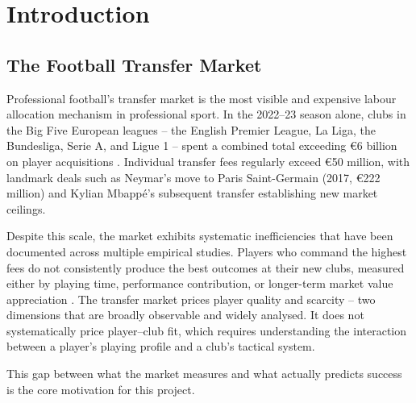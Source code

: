 \documentclass[12pt, a4paper, oneside]{report}
\begin{document}
\begin{titlepage}
\begin{abstract}
The system is deployed as an interactive Streamlit application with a complete scouting workflow including candidate filtering, fit scoring, injury watch mode, similar player search via embedding cosine similarity, and a market intelligence module.
\end{abstract}

\end{titlepage}

\tableofcontents
\newpage
\listoffigures
\newpage
\listoftables
\newpage

\chapter{Introduction}

\section{The Football Transfer Market}

Professional football's transfer market is the most visible and expensive labour allocation mechanism in professional sport. In the 2022--23 season alone, clubs in the Big Five European leagues -- the English Premier League, La Liga, the Bundesliga, Serie A, and Ligue 1 -- spent a combined total exceeding \euro{}6 billion on player acquisitions \citep{transfermarkt2023}. Individual transfer fees regularly exceed \euro{}50 million, with landmark deals such as Neymar's move to Paris Saint-Germain (2017, \euro{}222 million) and Kylian Mbappé's subsequent transfer establishing new market ceilings.

Despite this scale, the market exhibits systematic inefficiencies that have been documented across multiple empirical studies. Players who command the highest fees do not consistently produce the best outcomes at their new clubs, measured either by playing time, performance contribution, or longer-term market value appreciation \citep{torgler2007}. The transfer market prices player quality and scarcity -- two dimensions that are broadly observable and widely analysed. It does not systematically price player--club fit, which requires understanding the interaction between a player's playing profile and a club's tactical system.

This gap between what the market measures and what actually predicts success is the core motivation for this project.
\end{document}
